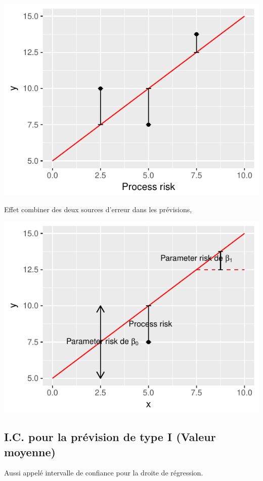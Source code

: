 \documentclass[11pt,french]{report}
\begin{document}
\begin{enumerate}
\begin{itemize}
\includegraphics{notes_de_cours-018}
\end{itemize}
\end{enumerate}

Effet combiner des deux sources d'erreur dans les prévisions,

\includegraphics{notes_de_cours-019}

\subsection{I.C. pour la prévision de type I (Valeur moyenne)}
\label{sec:type1}
Aussi appelé intervalle de confiance pour la droite de régression.
\bigskip
\end{document}
